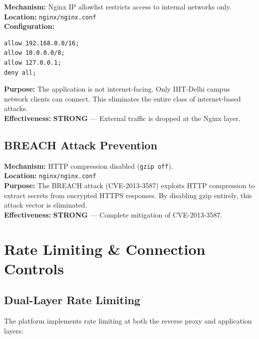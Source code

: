 \documentclass[11pt,a4paper]{article}
\begin{document}
\begin{tcolorbox}[colback=shieldgreen!5, colframe=shieldgreen]
\textbf{Mechanism:} Nginx IP allowlist restricts access to internal networks only.\\
\textbf{Location:} \texttt{nginx/nginx.conf}\\
\textbf{Configuration:}
\begin{verbatim}
allow 192.168.0.0/16;
allow 10.0.0.0/8;
allow 127.0.0.1;
deny all;
\end{verbatim}
\textbf{Purpose:} The application is not internet-facing. Only IIIT-Delhi campus network clients can connect. This eliminates the entire class of internet-based attacks.\\
\textbf{Effectiveness:} \textcolor{shieldgreen}{\textbf{STRONG}} — External traffic is dropped at the Nginx layer.
\end{tcolorbox}

\subsection{BREACH Attack Prevention}

\begin{tcolorbox}[colback=shieldgreen!5, colframe=shieldgreen]
\textbf{Mechanism:} HTTP compression disabled (\texttt{gzip off}).\\
\textbf{Location:} \texttt{nginx/nginx.conf}\\
\textbf{Purpose:} The BREACH attack (CVE-2013-3587) exploits HTTP compression to extract secrets from encrypted HTTPS responses. By disabling gzip entirely, this attack vector is eliminated.\\
\textbf{Effectiveness:} \textcolor{shieldgreen}{\textbf{STRONG}} — Complete mitigation of CVE-2013-3587.
\end{tcolorbox}

\section{Rate Limiting \& Connection Controls}

\subsection{Dual-Layer Rate Limiting}

The platform implements rate limiting at both the reverse proxy and application layers:
\end{document}
